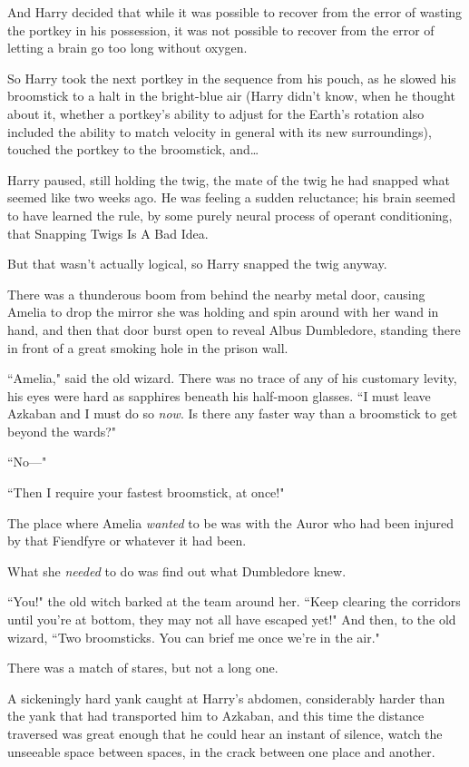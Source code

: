And Harry decided that while it was possible to recover from the error of wasting the portkey in his possession, it was not possible to recover from the error of letting a brain go too long without oxygen.

So Harry took the next portkey in the sequence from his pouch, as he slowed his broomstick to a halt in the bright-blue air (Harry didn't know, when he thought about it, whether a portkey's ability to adjust for the Earth's rotation also included the ability to match velocity in general with its new surroundings), touched the portkey to the broomstick, and{\ldots}

Harry paused, still holding the twig, the mate of the twig he had snapped what seemed like two weeks ago. He was feeling a sudden reluctance; his brain seemed to have learned the rule, by some purely neural process of operant conditioning, that Snapping Twigs Is A Bad Idea.

But that wasn't actually logical, so Harry snapped the twig anyway.

\later

There was a thunderous boom from behind the nearby metal door, causing Amelia to drop the mirror she was holding and spin around with her wand in hand, and then that door burst open to reveal Albus Dumbledore, standing there in front of a great smoking hole in the prison wall.

``Amelia," said the old wizard. There was no trace of any of his customary levity, his eyes were hard as sapphires beneath his half-moon glasses. ``I must leave Azkaban and I must do so \emph{now}. Is there any faster way than a broomstick to get beyond the wards?"

``No—"

``Then I require your fastest broomstick, at once!"

The place where Amelia \emph{wanted} to be was with the Auror who had been injured by that Fiendfyre or whatever it had been.

What she \emph{needed} to do was find out what Dumbledore knew.

``You!" the old witch barked at the team around her. ``Keep clearing the corridors until you're at bottom, they may not all have escaped yet!" And then, to the old wizard, ``Two broomsticks. You can brief me once we're in the air."

There was a match of stares, but not a long one.

\later

A sickeningly hard yank caught at Harry's abdomen, considerably harder than the yank that had transported him to Azkaban, and this time the distance traversed was great enough that he could hear an instant of silence, watch the unseeable space between spaces, in the crack between one place and another.

